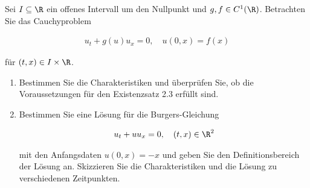 
\begin{exercise}

Sei $I \subseteq \R$ ein offenes Intervall um den Nullpunkt und $g, f \in C^1(\R)$.
Betrachten Sie das Cauchyproblem

\begin{align*}
    u_t + g(u) u_x = 0,
    \quad
    u(0, x) = f(x)
\end{align*}

für $(t, x) \in I \times \R$.

\begin{enumerate}[label = (\roman*)]

    \item Bestimmen Sie die Charakteristiken und überprüfen Sie, ob die Voraussetzungen für den Existenzsatz 2.3 erfüllt sind.

    \item Bestimmen Sie eine Lösung für die Burgers-Gleichung

    \begin{align*}
        u_t + u u_x = 0,
        \quad
        (t, x) \in \R^2
    \end{align*}

    mit den Anfangsdaten $u(0, x) = -x$ und geben Sie den Definitionsbereich der Lösung an.
    Skizzieren Sie die Charakteristiken und die Lösung zu verschiedenen Zeitpunkten.

\end{enumerate}

\end{exercise}


